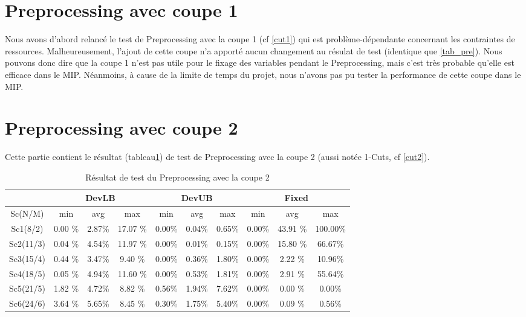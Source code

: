 \section{Preprocessing avec coupe 1}\label{test_c1}
Nous avons d'abord relancé le test de Preprocessing avec la coupe 1 (cf \ref{cut1}) qui est problème-dépendante concernant les contraintes de ressources. Malheureusement, l'ajout de cette coupe n'a apporté aucun changement au résulat de test (identique que \ref{tab_pre}). Nous pouvons donc dire que la coupe 1 n'est pas utile pour le fixage des variables pendant le Preprocessing, mais c'est très probable qu'elle est efficace dans le MIP. Néanmoins, à cause de la limite de temps du projet, nous n'avons pas pu tester la performance de cette coupe dans le MIP.


\section{Preprocessing avec coupe 2}\label{test_c2}
Cette partie contient le résultat (tableau\ref{tab_pre_2}) de test de Preprocessing avec la coupe 2 (aussi notée 1-Cuts, cf \ref{cut2}).
\begin{table}[h]
    \centering
    \begin{tabular}{|c|c|c|c|c|c|c|c|c|c|}
    	\hline
&\multicolumn{3}{c|}{DevLB}& \multicolumn{3}{c|}{DevUB}& \multicolumn{3}{c|}{Fixed} 	\\ \hline
    	Sc(N/M)	& min & avg & max & min & avg & max & min & avg & max\\ \hline
Sc1(8/2) & 0.00 \% &	2.87\%  &	17.07	\%  &0.00\% & 0.04\%  &0.65\%  &0.00\%  &43.91	\% &100.00\% \\ \hline
Sc2(11/3)& 0.04 \% & 	4.54\% & 	11.97	\% & 0.00\%&  0.01\% & 0.15\% & 0.00\%  &15.80	\% &66.67\%\\ \hline
Sc3(15/4)& 0.44 \% & 	3.47\% & 	9.40	\% & 0.00\%&  0.36\% & 1.80\% & 0.00\%  &2.22	\% &10.96\%\\ \hline
Sc4(18/5)& 0.05 \% & 	4.94\% & 	11.60	\% & 0.00\%&  0.53\% & 1.81\% & 0.00\%  &2.91	\% &55.64\%\\ \hline
Sc5(21/5)& 1.82 \% & 	4.72\% & 	8.82	\%  &0.56\% & 1.94\%  &7.62\%  &0.00\%  &0.00	\% &0.00\%\\ \hline
Sc6(24/6)& 3.64 \% & 	5.65\% & 	8.45	\%  &0.30\% & 1.75\%  &5.40\%  &0.00\%  &0.09	\% &0.56\%\\ \hline 
    \end{tabular}
    \caption{Résultat de test du Preprocessing avec la coupe 2}
    \label{tab_pre_2}
\end{table}
\bigskip


